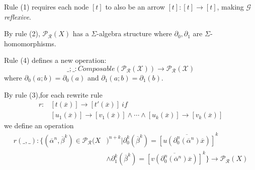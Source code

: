 \documentclass{beamer}
\begin{document}
\begin{frame}
    \scriptsize
    Rule (1) requires each node $[t]$ to also be an arrow $[t] : [t] \rightarrow [t]$, making $\mathcal{G}$ \emph{reflexive}.

    \bigskip
    \pause

    By rule (2), $\mathcal{P_R}(X)$ has a $\Sigma$-algebra structure where $\partial_0,\partial_1$ are 
    $\Sigma$-homomorphisms.

    \bigskip
    \pause
    Rule (4) defines a new operation:
    $$
    \_;\_ : Composable(\mathcal{P_R(X)}) \rightarrow \mathcal{P_R(X)}
    $$
    where $\partial_0(a;b) = \partial_0(a)$ and $\partial_1(a;b) = \partial_1(b)$.

    \bigskip
    \pause
    By rule (3),for each rewrite rule 
    \begin{align*}
        r:&[t(\overline{x})] \rightarrow [t'(\overline{x})]\ if \\ 
        &[u_1(\overline{x})] \rightarrow [v_1(\overline{x})] \wedge \cdots \wedge [u_k(\overline{x})] \rightarrow [v_k(\overline{x})] 
    \end{align*}
    we define an operation 
    \begin{align*}
        r(\_,\_) : \{(\overline{\alpha}^n,\overline{\beta}^k) \in \mathcal{P_R}(X&)^{n+k} 
        | \partial_0^k(\overline{\beta}^k) = \overline{[u(\partial_0^n(\overline{\alpha}^n)\overline{x})]}^k \\
        &\wedge  \partial_1^k(\overline{\beta}^k) = \overline{[v(\partial_0^n(\overline{\alpha}^n)\overline{x})]}^k\} \rightarrow \mathcal{P_R}(X)
    \end{align*}
\end{frame}
\end{document}
